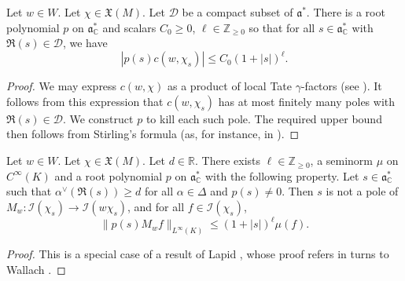 \begin{lemma}\label{lem:jacquet-integral-uniformity-question:let-chi-in}
  Let $w \in W$.  Let $\chi \in \mathfrak{X}(M)$.  Let $\mathcal{D}$ be a compact subset of $\mathfrak{a}^*$.  There is a root polynomial $p$ on $\mathfrak{a}_{\mathbb{C}}^*$ and scalars $C_0 \geq 0$, $\ell \in \mathbb{Z}_{\geq 0}$ so that for all $s \in \mathfrak{a}_{\mathbb{C}}^*$ with $\Re(s) \in \mathcal{D}$, we have
  \begin{equation*}
    |p(s) c(w,\chi_s)| \leq C_0 (1 + |s|)^{\ell}.
  \end{equation*}
\end{lemma}
\begin{proof}
  We may express $c(w,\chi)$ as a product of local Tate $\gamma$-factors (see \cite[Thm 1]{MR816396}).  It follows from this expression that $c(w,\chi_s)$ has at most finitely many poles with $\Re(s) \in \mathcal{D}$.  We construct $p$ to kill each such pole.  The required upper bound then follows from Stirling's formula (as, for instance, in \cite[\S2.2]{2021arXiv210112106B}).
\end{proof}
\begin{lemma}\label{lem:jacquet-integral-uniformity-question:let-chi-in-1}
  Let $w \in W$.  Let $\chi \in \mathfrak{X}(M)$.  Let $d \in \mathbb{R}$.  There exists $\ell \in \mathbb{Z}_{\geq 0}$, a seminorm $\mu$ on $C^\infty(K)$ and a root polynomial $p$ on $\mathfrak{a}_{\mathbb{C}}^*$ with the following property.  Let $s \in \mathfrak{a}_{\mathbb{C}}^*$ such that $\alpha^\vee(\Re(s)) \geq d$ for all $\alpha \in \Delta$ and $p(s) \neq 0$.  Then $s$ is not a pole of $M_w : \mathcal{I}(\chi_s) \rightarrow \mathcal{I}(w \chi_s)$, and for all $f \in \mathcal{I}(\chi_s)$,
  \begin{equation*}
    \|p(s) M_w f\|_{L^\infty(K)} \leq  (1 + |s|)^{\ell} \mu(f).
  \end{equation*}
\end{lemma}
\begin{proof}
  This is a special case of a result of Lapid \cite[Cor 2]{MR2402686}, whose proof refers in turns to Wallach \cite[\S10.1.11]{MR1170566}.
\end{proof}

